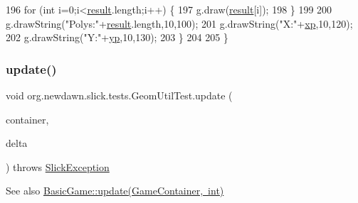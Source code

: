\begin{DoxyCode}
196             \textcolor{keywordflow}{for} (\textcolor{keywordtype}{int} i=0;i<\mbox{\hyperlink{classorg_1_1newdawn_1_1slick_1_1tests_1_1_geom_util_test_af4ae92e561e02a091075109486da4a61}{result}}.length;i++) \{
197                 g.draw(\mbox{\hyperlink{classorg_1_1newdawn_1_1slick_1_1tests_1_1_geom_util_test_af4ae92e561e02a091075109486da4a61}{result}}[i]);
198             \}
199             
200             g.drawString(\textcolor{stringliteral}{"Polys:"}+\mbox{\hyperlink{classorg_1_1newdawn_1_1slick_1_1tests_1_1_geom_util_test_af4ae92e561e02a091075109486da4a61}{result}}.length,10,100);
201             g.drawString(\textcolor{stringliteral}{"X:"}+\mbox{\hyperlink{classorg_1_1newdawn_1_1slick_1_1tests_1_1_geom_util_test_a8130a979872cdb74e28a21b5402fae21}{xp}},10,120);
202             g.drawString(\textcolor{stringliteral}{"Y:"}+\mbox{\hyperlink{classorg_1_1newdawn_1_1slick_1_1tests_1_1_geom_util_test_ab16aa08bab948180648dbf25d62810cf}{yp}},10,130);
203         \}
204         
205     \}
\end{DoxyCode}
\mbox{\label{classorg_1_1newdawn_1_1slick_1_1tests_1_1_geom_util_test_af7fe7552a975c1ae52fc4fbbd5240384}} 
\subsubsection{\texorpdfstring{update()}{update()}}
{\footnotesize\ttfamily void org.\+newdawn.\+slick.\+tests.\+Geom\+Util\+Test.\+update (\begin{DoxyParamCaption}\item[{\mbox{\hyperlink{classorg_1_1newdawn_1_1slick_1_1_game_container}{Game\+Container}}}]{container,  }\item[{int}]{delta }\end{DoxyParamCaption}) throws \mbox{\hyperlink{classorg_1_1newdawn_1_1slick_1_1_slick_exception}{Slick\+Exception}}\hspace{0.3cm}{\ttfamily [inline]}}

\begin{DoxySeeAlso}{See also}
\mbox{\hyperlink{classorg_1_1newdawn_1_1slick_1_1_basic_game_acfe6fa05aef83bff1631af91a3e4bd20}{Basic\+Game\+::update(\+Game\+Container, int)}} 
\end{DoxySeeAlso}


